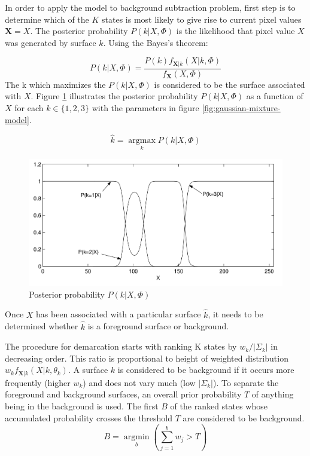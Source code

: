 In order to apply the model to background subtraction problem, first step is to determine which of the $K$ states is most likely to give rise to current pixel values $\mathbf{X}=X$. The posterior probability $P(k|X,\Phi)$ is the likelihood that pixel value $X$ was generated by surface $k$. Using the Bayes's theorem:

$$ P(k|X,\Phi) = \frac{P(k)f_{\mathbf{X}|k}(X|k,\Phi)}{f_\mathbf{X}(X,\Phi)} $$
The k which maximizes the $P(k|X,\Phi) $ is considered to be the surface associated with $X$. Figure \ref{fig:gaussian-posterior-probability} illustrates the posterior probability $P(k|X,\Phi) $ as a function of $X$ for each $k\in \{  1,2,3 \}$ with the parameters in figure \ref{fig:gaussian-mixture-model}.

$$ \hat{k}=\operatorname*{argmax}_k P(k|X,\Phi)$$
\begin{figure}
    \centering
    \includegraphics[width=\linewidth]{images/gaussian-posterior-probability.PNG}
    \caption[Posterior probability]{Posterior probability  $P(k|X,\Phi) $\cite{power2002understanding}}
    \label{fig:gaussian-posterior-probability}
\end{figure}


Once $X$ has been associated with a particular surface $\hat{k}$, it needs to be determined whether $\hat{k}$ is a foreground surface or background. 

The procedure for demarcation starts with ranking K states by $w_k / | \Sigma_k |$ in decreasing order. This ratio is proportional to height of weighted distribution $w_k f_{\mathbf{X}|k}(X|k,\theta_k)$. A surface $k$ is considered to be 
background if it occurs more frequently (higher $w_k$) and does not vary much (low $|\Sigma_k|$).  To separate the foreground and background surfaces, an overall prior probability $T$ of anything being in the background is used. The first $B$ of the ranked  states whose accumulated probability crosses the threshold $T$ are considered to be background. 
$$ B=\operatorname*{argmin}_b (\sum_{j=1}^b w_{j} > T)$$ 

